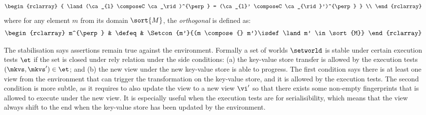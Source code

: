 \begin{definition}
\[\begin{rclarray}
{        \land (\ca_{l} \composeC \ca_\rid)^{\perp} = (\ca_{l}' \composeC \ca_{\rid}')^{\perp}
	} \\
    \end{rclarray}
\]
where for any element \( m \) from its domain \( \sort{M} \), the  \emph{orthogonal} is defined as:
\[
\begin{rclarray}
m^{\perp} & \defeq & \Setcon{m'}{(m \compose{} m')\isdef \land m' \in \sort{M}} 
\end{rclarray}
\]
\end{definition}

The stabilisation says assertions remain true against the environment.
Formally a set of worlds \( \setworld \) is stable under certain execution tests \( \et \) if the set is closed under rely relation under the side conditions: (a) the key-value store transfer is allowed by the execution tests \( (\mkvs, \mkvs') \in \et \); and (b) the new view under the new key-value store is able to progress.
The first condition says there is at least one view from the environment that can trigger the transformation on the key-value store, and it is allowed by the execution tests.
The second condition is more subtle, as it requires to also update the view to a new view \( \vi' \) so that there exists some non-empty fingerprints that is allowed to execute under the new view.
It is especially useful when the execution tests are for serialisibility, which means that the view always shift to the end when the key-value store has been updated by the environment.

